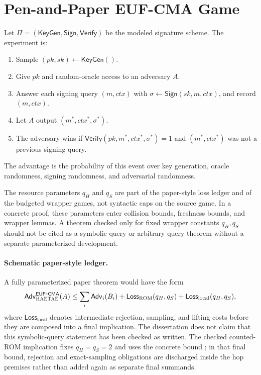 \section{Pen-and-Paper EUF-CMA Game}

Let \(\Pi=(\mathsf{KeyGen},\mathsf{Sign},\mathsf{Verify})\) be the modeled
\haetae{} signature scheme.  The \eufcma{} experiment is:

\begin{enumerate}
\item Sample \((pk,sk)\leftarrow \mathsf{KeyGen}()\).
\item Give \(pk\) and random-oracle access to an adversary \(A\).
\item Answer each signing query \((m,ctx)\) with
\(\sigma\leftarrow\mathsf{Sign}(sk,m,ctx)\), and record \((m,ctx)\).
\item Let \(A\) output \((m^*,ctx^*,\sigma^*)\).
\item The adversary wins if
\(\mathsf{Verify}(pk,m^*,ctx^*,\sigma^*)=1\) and \((m^*,ctx^*)\) was not a
previous signing query.
\end{enumerate}

The advantage is the probability of this event over key generation, oracle
randomness, signing randomness, and adversarial randomness.

The resource parameters \(q_H\) and \(q_S\) are part of the paper-style loss
ledger and of the budgeted wrapper games, not syntactic caps on the source
 game.  In a concrete proof, these parameters enter
collision bounds, freshness bounds, and wrapper lemmas.  A theorem checked only
for fixed wrapper constants \(q_H,q_S\) should not be cited as a symbolic-query
or arbitrary-query theorem without a separate parameterized development.

\paragraph{Schematic paper-style ledger.}
A fully parameterized paper theorem would have the form
\[
\mathsf{Adv}^{\mathsf{EUF}\mbox{-}\mathsf{CMA}}_{\textsc{HAETAE}}(A)
\le
\sum_i \mathsf{Adv}_i(B_i) + \mathsf{Loss}_{\mathrm{ROM}}(q_H,q_S)
+ \mathsf{Loss}_{\mathrm{local}}(q_H,q_S),
\]
where \(\mathsf{Loss}_{\mathrm{local}}\) denotes intermediate rejection,
sampling, and lifting costs before they are composed into a final implication.
The dissertation does not claim that this symbolic-query statement has been
checked as written.  The checked counted-ROM implication fixes \(q_H=q_S=2\) and
uses the concrete bound ; in that final
bound, rejection and exact-sampling obligations are discharged inside the hop
premises rather than added again as separate final summands.


